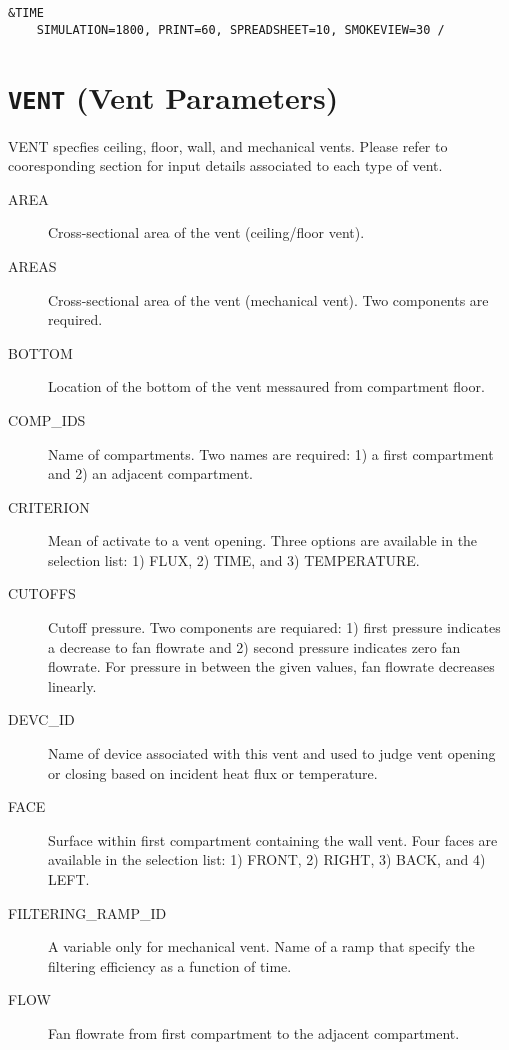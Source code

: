 \begin{lstlisting}
&TIME 
	SIMULATION=1800, PRINT=60, SPREADSHEET=10, SMOKEVIEW=30 /
\end{lstlisting}

\vspace{\baselineskip}



\section{\texorpdfstring{{\tt VENT}}{VENT} (Vent Parameters)}

VENT specfies ceiling, floor, wall, and mechanical vents. Please refer to cooresponding section for input details associated to each type of vent.

\begin{adjustwidth}{1cm}{0cm}
\begin{description}
  \item[AREA] Cross-sectional area of the vent (ceiling/floor vent).
  \item[AREAS] Cross-sectional area of the vent (mechanical vent). Two components are required.
  \item[BOTTOM] Location of the bottom of the vent messaured from compartment floor.
  \item[COMP\_IDS] Name of compartments. Two names are required: 1) a first compartment and 2) an adjacent compartment. 
  \item[CRITERION] Mean of activate to a vent opening. Three options are available in the selection list: 1) FLUX, 2) TIME, and 3) TEMPERATURE.
  \item[CUTOFFS] Cutoff pressure. Two components are requiared: 1) first pressure indicates a decrease to fan flowrate and 2) second pressure indicates zero fan flowrate. For pressure in between the given values, fan flowrate decreases linearly.
  \item[DEVC\_ID] Name of device associated with this vent and used to judge vent opening or closing based on  incident heat flux or temperature.
  \item[FACE] Surface within first compartment containing the wall vent. Four faces are available in the selection list: 1) FRONT, 2) RIGHT, 3) BACK, and 4) LEFT.
  \item[FILTERING\_RAMP\_ID] A variable only for mechanical vent. Name of a ramp that specify the filtering efficiency as a function of time.
  \item[FLOW] Fan flowrate from first compartment to the adjacent compartment.

\end{description}
\end{adjustwidth}
